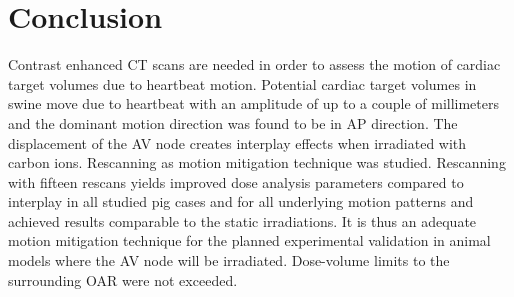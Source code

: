 \vspace*{-0.3cm}
\section{Conclusion}

Contrast enhanced CT scans are needed in order to assess the motion of cardiac target volumes due to heartbeat motion. 
Potential cardiac target volumes in swine move due to heartbeat with an amplitude of up to a couple of millimeters and the 
dominant motion direction was found to be in AP direction. The displacement of the AV node creates interplay effects when 
irradiated with carbon ions. Rescanning as motion mitigation technique was studied. 
Rescanning with fifteen rescans yields improved dose analysis parameters compared to interplay in all studied pig cases and for all 
underlying motion patterns and achieved results comparable to the static irradiations. It is thus an adequate motion mitigation technique for 
the planned experimental validation in animal models where the AV node will be irradiated. Dose-volume limits to the surrounding OAR were not 
exceeded. 



